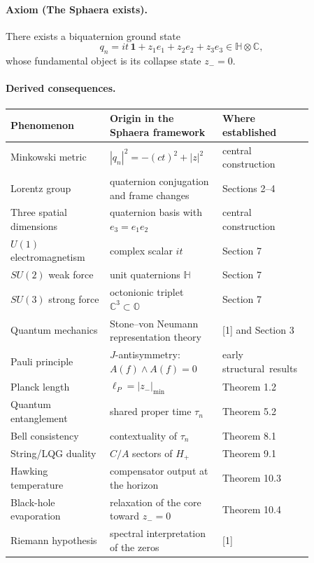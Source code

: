 \documentclass[12pt,a4paper]{article}
\begin{document}
\paragraph*{Axiom (The Sphaera exists).}
There exists a biquaternion ground state
\[
q_n = it\,\mathbf{1} + z_1 e_1 + z_2 e_2 + z_3 e_3 \in \mathbb{H} \otimes \mathbb{C},
\]
whose fundamental object is its collapse state $z_-=0$.

\paragraph*{Derived consequences.}
\begin{center}
\begin{tabular}{p{0.30\linewidth} p{0.32\linewidth} p{0.24\linewidth}}
\toprule
Phenomenon & Origin in the Sphaera framework & Where established \\
\midrule
Minkowski metric & $|q_n|^2 = -(ct)^2 + |z|^2$ & central construction \\
Lorentz group & quaternion conjugation and frame changes & Sections 2--4 \\
Three spatial dimensions & quaternion basis with $e_3=e_1e_2$ & central construction \\
$U(1)$ electromagnetism & complex scalar $it$ & Section 7 \\
$SU(2)$ weak force & unit quaternions $\mathbb{H}$ & Section 7 \\
$SU(3)$ strong force & octonionic triplet $\mathbb{C}^3 \subset \mathbb{O}$ & Section 7 \\
Quantum mechanics & Stone--von Neumann representation theory & [1] and Section 3 \\
Pauli principle & $J$-antisymmetry: $A(f)\wedge A(f)=0$ & early structural\
results \\
Planck length & $\ell_P = |z_-|_{\min}$ & Theorem 1.2 \\
Quantum entanglement & shared proper time $\tau_n$ & Theorem 5.2 \\
Bell consistency & contextuality of $\tau_n$ & Theorem 8.1 \\
String/LQG duality & $C/A$ sectors of $H_+$ & Theorem 9.1 \\
Hawking temperature & compensator output at the horizon & Theorem 10.3 \\
Black-hole evaporation & relaxation of the core toward $z_-=0$ & Theorem 10.4 \\
Riemann hypothesis & spectral interpretation of the zeros & [1] \\
\bottomrule
\end{tabular}
\end{center}
\end{document}
